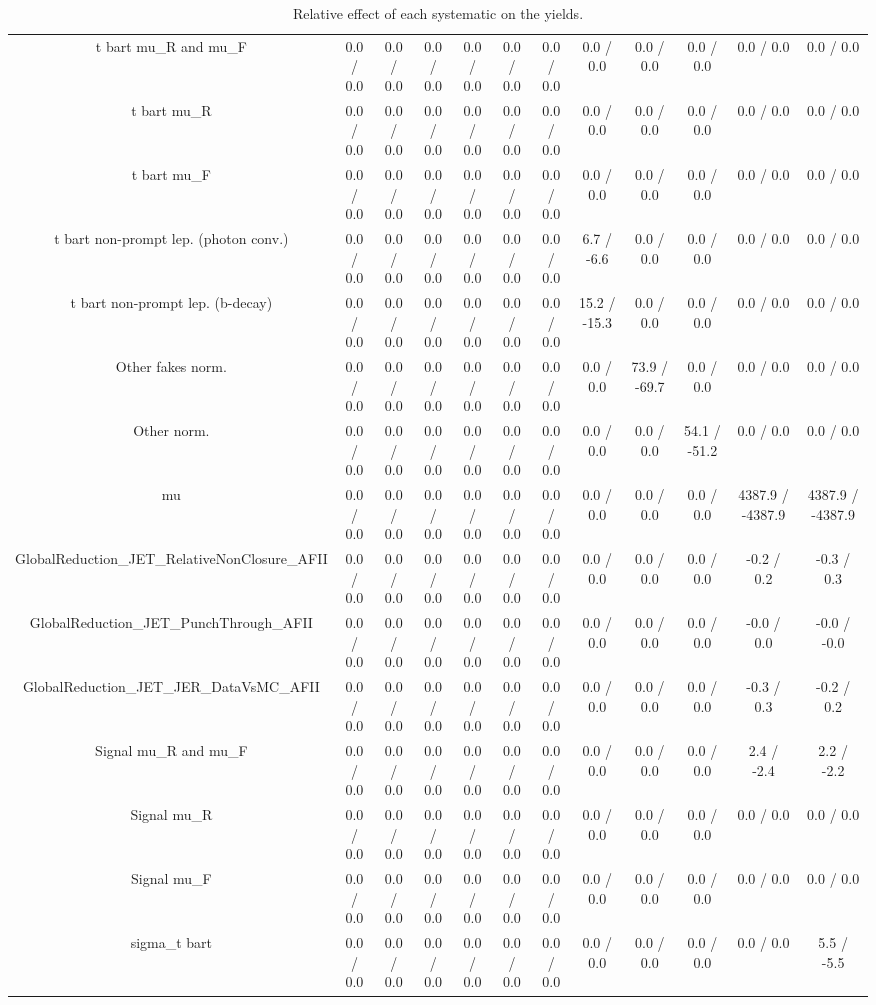 \begin{table}[htbp]
\begin{center}
\begin{tabular}{|c|c|c|c|c|c|c|c|c|c|c|c|}
  t bar{t}  mu_{R} and  mu_{F} & 0.0 / 0.0 & 0.0 / 0.0 & 0.0 / 0.0 & 0.0 / 0.0 & 0.0 / 0.0 & 0.0 / 0.0 & 0.0 / 0.0 & 0.0 / 0.0 & 0.0 / 0.0 & 0.0 / 0.0 & 0.0 / 0.0 \\ 
  t bar{t}  mu_{R} & 0.0 / 0.0 & 0.0 / 0.0 & 0.0 / 0.0 & 0.0 / 0.0 & 0.0 / 0.0 & 0.0 / 0.0 & 0.0 / 0.0 & 0.0 / 0.0 & 0.0 / 0.0 & 0.0 / 0.0 & 0.0 / 0.0 \\ 
  t bar{t}  mu_{F} & 0.0 / 0.0 & 0.0 / 0.0 & 0.0 / 0.0 & 0.0 / 0.0 & 0.0 / 0.0 & 0.0 / 0.0 & 0.0 / 0.0 & 0.0 / 0.0 & 0.0 / 0.0 & 0.0 / 0.0 & 0.0 / 0.0 \\ 
  t bar{t} non-prompt lep. (photon conv.) & 0.0 / 0.0 & 0.0 / 0.0 & 0.0 / 0.0 & 0.0 / 0.0 & 0.0 / 0.0 & 0.0 / 0.0 & 6.7 / -6.6 & 0.0 / 0.0 & 0.0 / 0.0 & 0.0 / 0.0 & 0.0 / 0.0 \\ 
  t bar{t} non-prompt lep. (b-decay) & 0.0 / 0.0 & 0.0 / 0.0 & 0.0 / 0.0 & 0.0 / 0.0 & 0.0 / 0.0 & 0.0 / 0.0 & 15.2 / -15.3 & 0.0 / 0.0 & 0.0 / 0.0 & 0.0 / 0.0 & 0.0 / 0.0 \\ 
  Other fakes norm. & 0.0 / 0.0 & 0.0 / 0.0 & 0.0 / 0.0 & 0.0 / 0.0 & 0.0 / 0.0 & 0.0 / 0.0 & 0.0 / 0.0 & 73.9 / -69.7 & 0.0 / 0.0 & 0.0 / 0.0 & 0.0 / 0.0 \\ 
  Other norm. & 0.0 / 0.0 & 0.0 / 0.0 & 0.0 / 0.0 & 0.0 / 0.0 & 0.0 / 0.0 & 0.0 / 0.0 & 0.0 / 0.0 & 0.0 / 0.0 & 54.1 / -51.2 & 0.0 / 0.0 & 0.0 / 0.0 \\ 
  mu & 0.0 / 0.0 & 0.0 / 0.0 & 0.0 / 0.0 & 0.0 / 0.0 & 0.0 / 0.0 & 0.0 / 0.0 & 0.0 / 0.0 & 0.0 / 0.0 & 0.0 / 0.0 & 4387.9 / -4387.9 & 4387.9 / -4387.9 \\ 
  GlobalReduction_JET_RelativeNonClosure_AFII & 0.0 / 0.0 & 0.0 / 0.0 & 0.0 / 0.0 & 0.0 / 0.0 & 0.0 / 0.0 & 0.0 / 0.0 & 0.0 / 0.0 & 0.0 / 0.0 & 0.0 / 0.0 & -0.2 / 0.2 & -0.3 / 0.3 \\ 
  GlobalReduction_JET_PunchThrough_AFII & 0.0 / 0.0 & 0.0 / 0.0 & 0.0 / 0.0 & 0.0 / 0.0 & 0.0 / 0.0 & 0.0 / 0.0 & 0.0 / 0.0 & 0.0 / 0.0 & 0.0 / 0.0 & -0.0 / 0.0 & -0.0 / -0.0 \\ 
  GlobalReduction_JET_JER_DataVsMC_AFII & 0.0 / 0.0 & 0.0 / 0.0 & 0.0 / 0.0 & 0.0 / 0.0 & 0.0 / 0.0 & 0.0 / 0.0 & 0.0 / 0.0 & 0.0 / 0.0 & 0.0 / 0.0 & -0.3 / 0.3 & -0.2 / 0.2 \\ 
  Signal  mu_{R} and  mu_{F} & 0.0 / 0.0 & 0.0 / 0.0 & 0.0 / 0.0 & 0.0 / 0.0 & 0.0 / 0.0 & 0.0 / 0.0 & 0.0 / 0.0 & 0.0 / 0.0 & 0.0 / 0.0 & 2.4 / -2.4 & 2.2 / -2.2 \\ 
  Signal  mu_{R} & 0.0 / 0.0 & 0.0 / 0.0 & 0.0 / 0.0 & 0.0 / 0.0 & 0.0 / 0.0 & 0.0 / 0.0 & 0.0 / 0.0 & 0.0 / 0.0 & 0.0 / 0.0 & 0.0 / 0.0 & 0.0 / 0.0 \\ 
  Signal  mu_{F} & 0.0 / 0.0 & 0.0 / 0.0 & 0.0 / 0.0 & 0.0 / 0.0 & 0.0 / 0.0 & 0.0 / 0.0 & 0.0 / 0.0 & 0.0 / 0.0 & 0.0 / 0.0 & 0.0 / 0.0 & 0.0 / 0.0 \\ 
   sigma_{t bar{t}} & 0.0 / 0.0 & 0.0 / 0.0 & 0.0 / 0.0 & 0.0 / 0.0 & 0.0 / 0.0 & 0.0 / 0.0 & 0.0 / 0.0 & 0.0 / 0.0 & 0.0 / 0.0 & 0.0 / 0.0 & 5.5 / -5.5 \\ 
\hline 
\end{tabular} 
\caption{Relative effect of each systematic on the yields.} 
\end{center} 
\end{table} 
